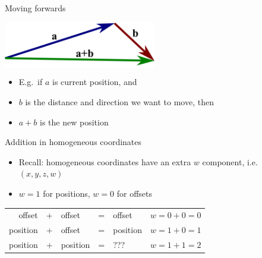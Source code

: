 \begin{frame}{Moving forwards}
	\pause
	\begin{center}
		\colorbox{white}{
			\includegraphics[width=0.5\textwidth]{vector_addition}
		}
	\end{center}
	\begin{itemize}
		\pause\item E.g.\ if $a$ is current position, and
		\pause\item $b$ is the distance and direction we want to move, then
		\pause\item $a + b$ is the new position
	\end{itemize}
\end{frame}

\begin{frame}{Addition in homogeneous coordinates}
	\begin{itemize}
		\pause\item Recall: homogeneous coordinates have an extra $w$ component, i.e.\ $(x,y,z,w)$
		\pause\item $w=1$ for positions, $w=0$ for offsets
	\end{itemize}
	\begin{tabular}{rclclc}
		\pause offset & + & offset & = & offset & $w = 0 + 0 = 0$ \\
		\pause position & + & offset & = & position & $w = 1 + 0 = 1$ \\
		\pause position & + & position & = & ??? & $w = 1 + 1 = 2$
	\end{tabular}
\end{frame}

